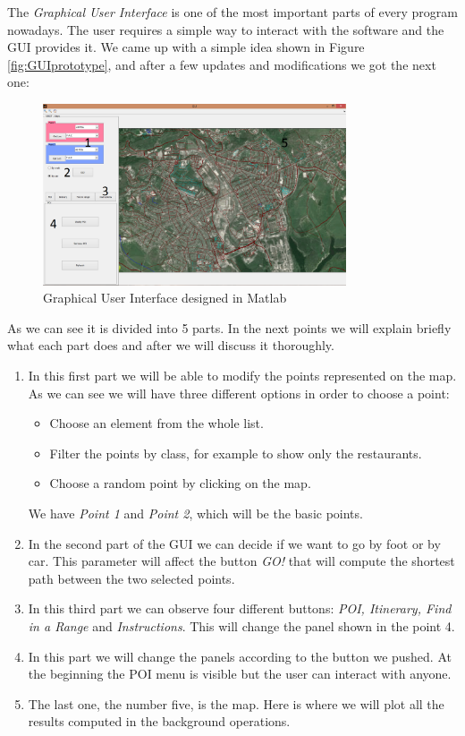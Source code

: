 \documentclass{article}
\begin{document}
The \textit{Graphical User Interface} is one of the most important parts of every program nowadays. The user requires a simple way to interact with the software and the GUI provides it. We came up with a simple idea shown in Figure \ref{fig:GUIprototype}, and after a few updates and modifications we got the next one:

\begin{figure}[h]
\centering
\includegraphics[width=0.8\textwidth]{gui.png}
\caption{Graphical User Interface designed in Matlab}
\label{fig:guiMatlab}
\end{figure}

As we can see it is divided into 5 parts. In the next points we will explain briefly what each part does and after we will discuss it thoroughly.

\begin{enumerate}
\item
In this first part we will be able to modify the points represented on the map. As we can see we will have three different options in order to choose a point:
	\begin{itemize}
	\item
	Choose an element from the whole list.
	\item
	Filter the points by class, for example to show only the restaurants.
	\item
	Choose a random point by clicking on the map.
	\end{itemize}
We have \textit{Point 1} and \textit{Point 2}, which will be the basic points.

\item
In the second part of the GUI we can decide if we want to go by foot or by car. This parameter will affect the button \textit{GO!} that will compute the shortest path between the two selected points.

\item
In this third part we can observe four different buttons: \textit{POI, Itinerary, Find in a Range} and \textit{Instructions}. This will change the panel shown in the point 4.

\item
In this part we will change the panels according to the button we pushed. At the beginning the POI menu is visible but the user can interact with anyone.

\item
The last one, the number five, is the map. Here is where we will plot all the results computed in the background operations.
\end{enumerate}
\end{document}
